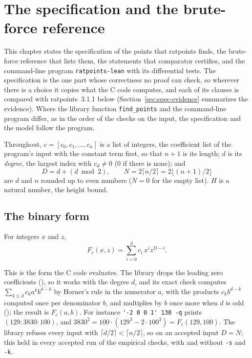 \chapter{The specification and the brute-force reference}\label{chap:spec}

This chapter states the specification of the points that ratpoints finds, the brute-force reference
that lists them, the statements that comparator certifies, and the command-line program
\verb|ratpoints-lean| with its differential tests. The specification is the one part whose
correctness no proof can check, so wherever there is a choice it copies what the C code computes,
and each of its clauses is compared with ratpoints~3.1.1 below (Section~\ref{sec:spec-evidence}
summarizes the evidence). Where the library function \verb|find_points| and the command-line program
differ, as in the order of the checks on the input, the specification and the model follow the
program.

Throughout, $c = [c_0, c_1, \dots, c_n]$ is a list of integers, the coefficient list of the
program's input with the constant term first, so that $n + 1$ is its length; $d$ is its
\emph{degree}, the largest index with $c_d \ne 0$ ($0$ if there is none); and
\[ D = d + (d \bmod 2), \qquad N = 2 \lceil n/2 \rceil = 2 \lfloor (n+1)/2 \rfloor \]
are $d$ and $n$ rounded up to even numbers ($N = 0$ for the empty list). $H$ is a natural number,
the height bound.

\section{The binary form}

\begin{definition}\label{def:binaryForm}
  \leanok
  For integers $x$ and $z$,
  \[ F_c(x, z) = \sum_{i=0}^{d} c_i\, x^i z^{D-i}. \]
\end{definition}

\begin{remark}\label{rem:degree}
  This is the form the C code evaluates. The library drops the leading zero coefficients
  (), so it works with the degree $d$, and its exact check
  computes $\sum_{k \le d} c_k a^k b^{d-k}$ by Horner's rule in the numerator $a$, with the
  products $c_k b^{d-k}$ computed once per denominator $b$, and multiplies by $b$ once more when
  $d$ is odd (); the result is $F_c(a, b)$. For instance
  \verb|'-2 0 0 1' 130 -q| prints $(129 : 3830 : 100)$, and $3830^2 = 100 \cdot (129^3 - 2 \cdot
  100^3) = F_c(129, 100)$. The library refuses every input with
  $\lceil d/2 \rceil < \lceil n/2 \rceil$, so on an accepted input $D = N$; this held in every
  accepted run of the empirical checks, with and without \verb|-s| and \verb|-k|.
\end{remark}

